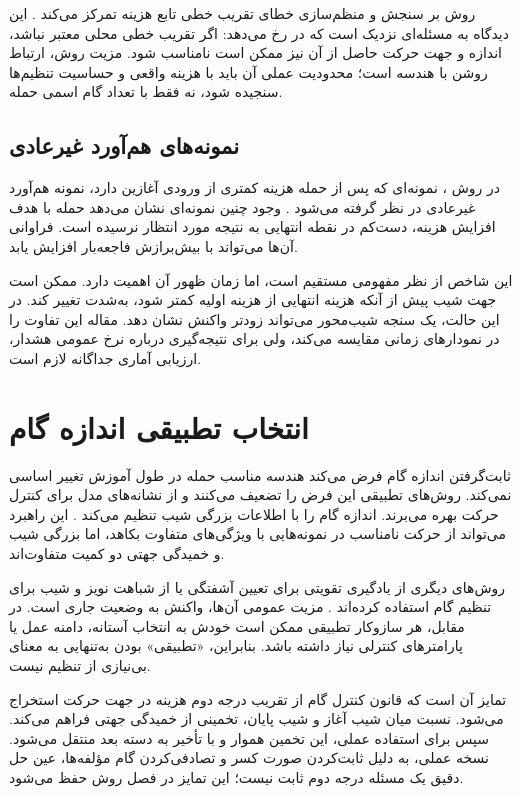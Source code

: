 روش  بر سنجش و منظم‌سازی خطای تقریب خطی تابع هزینه تمرکز می‌کند \cite{rocamora2024efficient}. این دیدگاه به مسئله‌ای نزدیک است که در  رخ می‌دهد: اگر تقریب خطی محلی معتبر نباشد، اندازه و جهت حرکت حاصل از آن نیز ممکن است نامناسب شود. مزیت روش، ارتباط روشن با هندسه است؛ محدودیت عملی آن باید با هزینه واقعی و حساسیت تنظیم‌ها سنجیده شود، نه فقط با تعداد گام اسمی حمله.

\subsection{نمونه‌های هم‌آورد غیرعادی}
در روش ، نمونه‌ای که پس از حمله هزینه کمتری از ورودی آغازین دارد، نمونه هم‌آورد غیرعادی در نظر گرفته می‌شود \cite{lin2023eliminating}. وجود چنین نمونه‌ای نشان می‌دهد حمله با هدف افزایش هزینه، دست‌کم در نقطه انتهایی به نتیجه مورد انتظار نرسیده است. فراوانی آن‌ها می‌تواند با بیش‌برازش فاجعه‌بار افزایش یابد.

این شاخص از نظر مفهومی مستقیم است، اما زمان ظهور آن اهمیت دارد. ممکن است جهت شیب پیش از آنکه هزینه انتهایی از هزینه اولیه کمتر شود، به‌شدت تغییر کند. در این حالت، یک سنجه شیب‌محور می‌تواند زودتر واکنش نشان دهد. مقاله \sora{} این تفاوت را در نمودارهای زمانی مقایسه می‌کند، ولی برای نتیجه‌گیری درباره نرخ عمومی هشدار، ارزیابی آماری جداگانه لازم است.

\section{انتخاب تطبیقی اندازه گام}
ثابت‌گرفتن اندازه گام فرض می‌کند هندسه مناسب حمله در طول آموزش تغییر اساسی نمی‌کند. روش‌های تطبیقی این فرض را تضعیف می‌کنند و از نشانه‌های مدل برای کنترل حرکت بهره می‌برند.  اندازه گام را با اطلاعات بزرگی شیب تنظیم می‌کند \cite{huang2023fast}. این راهبرد می‌تواند از حرکت نامناسب در نمونه‌هایی با ویژگی‌های متفاوت بکاهد، اما بزرگی شیب و خمیدگی جهتی دو کمیت متفاوت‌اند.

روش‌های دیگری از یادگیری تقویتی برای تعیین آشفتگی یا از شباهت نویز و شیب برای تنظیم گام استفاده کرده‌اند \cite{nie2021adaptive,zhao2025avoiding}. مزیت عمومی آن‌ها، واکنش به وضعیت جاری است. در مقابل، هر سازوکار تطبیقی ممکن است خودش به انتخاب آستانه، دامنه عمل یا پارامترهای کنترلی نیاز داشته باشد. بنابراین، «تطبیقی» بودن به‌تنهایی به معنای بی‌نیازی از تنظیم نیست.

تمایز \sora{} آن است که قانون کنترل گام از تقریب درجه دوم هزینه در جهت حرکت استخراج می‌شود. نسبت میان شیب آغاز و شیب پایان، تخمینی از خمیدگی جهتی فراهم می‌کند. سپس برای استفاده عملی، این تخمین هموار و با تأخیر به دسته بعد منتقل می‌شود. نسخه عملی، به دلیل ثابت‌کردن صورت کسر و تصادفی‌کردن گام مؤلفه‌ها، عین حل دقیق یک مسئله درجه دوم ثابت نیست؛ این تمایز در فصل روش حفظ می‌شود.

